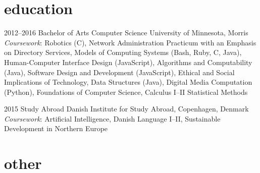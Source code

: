 \documentclass[]{cv-style} %
\begin{document}
\begin{entrylist}



\end{entrylist}

\vspace{-0.2cm}
\section{education}

\begin{entrylist}


\entry
{2012--2016}
{Bachelor of Arts {\normalfont Computer Science}}
{University of Minnesota, Morris}
{\emph{Coursework}: \footnotesize{Robotics (C), Network Administration Practicum with an Emphasis on Directory Services, Models of Computing Systems (Bash, Ruby, C, Java), Human-Computer Interface Design (JavaScript), Algorithms and Computability (Java), Software Design and Development (JavaScript), Ethical and Social Implications of Technology, Data Structures (Java), Digital Media Computation (Python), Foundations of Computer Science, Calculus I--II Statistical Methods}}

\entry
{2015}
{Study Abroad}
{Danish Institute for Study Abroad, Copenhagen, Denmark}
{\emph{Coursework}: \footnotesize{Artificial Intelligence, Danish Language I--II, Sustainable Development in Northern Europe}}

\end{entrylist}


\section{other}
\end{document}

